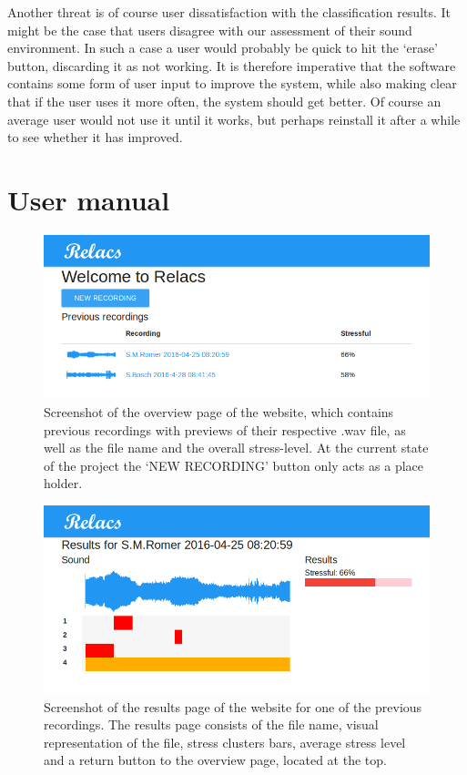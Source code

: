\documentclass[a4paper]{article}
\begin{document}
Another threat is of course user dissatisfaction with the classification results.
It might be the case that users disagree with our assessment of their sound environment.
In such a case a user would probably be quick to hit the `erase' button, discarding it as not working.
It is therefore imperative that the software contains some form of user input to improve the system, while also making clear that if the user uses it more often, the system should get better.
Of course an average user would not use it until it works, but perhaps reinstall it after a while to see whether it has improved.

\section{User manual}
\begin{figure}[t]
\centering
\includegraphics[width=0.7\linewidth]{./Website}
\caption{Screenshot of the overview page of the website, which contains previous recordings with previews of their respective .wav file, as well as the file name and the overall stress-level. At the current state of the project the `NEW RECORDING' button only acts as a place holder.}
\label{fig:Website}
\end{figure}

\begin{figure}[t]
\centering
\includegraphics[width=0.7\linewidth]{./Audio1Results}
\caption{Screenshot of the results page of the website for one of the previous recordings. The results page consists of the file name, visual representation of the file, stress clusters bars, average stress level and a return button to the overview page, located at the top.}
\label{fig:Audio1}
\end{figure}
\end{document}
